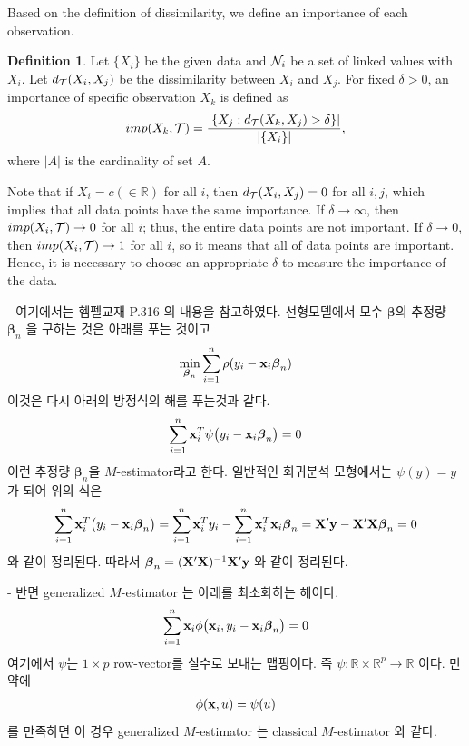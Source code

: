 \documentclass[preprint, review, 12pt]{article}
\theoremstyle{definition}
\newtheorem{dfn}{Definition}
\theoremstyle{remark}
\begin{document}
Based on the definition of dissimilarity, we define an importance of each observation.

\begin{dfn}
	Let $\{X_i\}$ be the given data and ${\cal N}_{i}$ be a set of linked values with $X_i$. Let $d_{\cal T}(X_i,X_j)$ be the dissimilarity between $X_i$ and $X_j$. For fixed $\delta>0$, an importance of specific observation $X_{k}$ is defined as 
	\[
	imp(X_{k},{\cal T})=\frac{\left|\{X_{j}:d_{\cal T}(X_{k},X_{j})>\delta\}\right|}{\left|\{X_i\}\right|}, 
	\]
	where $|A|$ is the cardinality of set $A$. 
\end{dfn}

Note that if $X_i=c(\in \mathbb{R})$ for all $i$, then $d_{\cal T}(X_i,X_j)=0$ for all $i,j$, which implies that all data points have the same importance. If $\delta \to \infty$, then $imp(X_i,{\cal T}) \to 0$ for all $i$; thus, the entire data points are not important. If $\delta \to 0$, then $imp(X_i,{\cal T}) \to 1$ for all $i$, so it means that all of data points are important. Hence, it is necessary to choose an  appropriate $\delta$ to measure the importance of the data. 
\fi 

\iffalse %
- 여기에서는 헴펠교재 P.316 의 내용을 참고하였다. 선형모델에서 모수 $\boldsymbol{\beta}$의 추정량 $\boldsymbol{\beta}_ n$ 을 구하는 것은 아래를 푸는 것이고 
\begin{align}
\min_{\boldsymbol{\beta}_ n}\sum_{i=1}^{n}\rho(y_i-{\bf x}_ i \boldsymbol{\beta}_ n)
\end{align}
이것은 다시 아래의 방정식의 해를 푸는것과 같다. 
\begin{align}
\sum_{i=1}^{n}{\bf x}_ i^T\psi\big(y_i-{\bf x}_ i \boldsymbol{\beta}_ n\big)=0 
\end{align}
이런 추정량 $\boldsymbol{\beta}_ n$을 $M$-estimator라고 한다. 일반적인 회귀분석 모형에서는 $\psi(y)=y$ 가 되어 위의 식은 
\begin{align}
\sum_{i=1}^{n}{\bf x}_ i^T\big(y_i-{\bf x}_ i \boldsymbol{\beta}_ n\big)=\sum_{i=1}^{n}{\bf x}_ i^T y_i-\sum_{i=1}^{n}{\bf x}_ i^T {\bf x}_ i \boldsymbol{\beta}_ n= {\bf X}'{\bf y}-{\bf X}'{\bf X}\boldsymbol{\beta}_ n=0 
\end{align}
와 같이 정리된다. 따라서 $\boldsymbol{\beta}_ n = ({\bf X}'{\bf X})^{-1}{\bf X}'{\bf y}$ 와 같이 정리된다.

- 반면 generalized $M$-estimator 는 아래를 최소화하는 해이다. 
\begin{align}
\sum_{i=1}^{n}{\bf x}_ i \phi\big({\bf x}_ i , y_i-{\bf x}_ i \boldsymbol{\beta}_ n\big) =0 
\end{align}
여기에서 $\psi$는 $1\times p$ row-vector를 실수로 보내는 맵핑이다. 즉 $\psi:\mathbb{R}\times \mathbb{R}^p \to \mathbb{R}$ 이다. 만약에 
\begin{align}
\phi({\bf x},u)=\psi(u)
\end{align}
를 만족하면 이 경우 generalized $M$-estimator 는 classical $M$-estimator 와 같다. 
\end{document}
